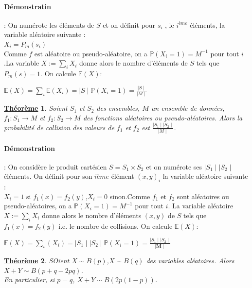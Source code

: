 \documentclass[12pt,openany]{report}
\newtheorem{theorem}{\underline{Théorème}}
\begin{document}
\paragraph{Démonstratin}: On numérote les éléments de $S$ et on définit pour $s_i$
, le $i^{ème}$ éléments, la variable aléatoire suivante :\\
$X_{i}=P_{m}(s_i)  $\\
Comme $f$ est aléatoire ou pseudo-aléatoire, on a $\mathbb{P}(X_i=1)=M^{-1}$ pour tout $i$.La variable $ X:=\sum_{i}X_i$ donne alors le nombre d'éléments de $ \mathit{S}$ tels que $P_{m}(s)=1 $. On calcule $\mathbb{E}(X)$:
\begin{center}
$ \mathbb{E}(X)=\sum_{i}\mathbb{E}(X_i)=\mid \mathit{S} \mid\mathbb{P}(X_i=1)=\frac{\mid S \mid}{\mid M \mid}$
\end{center}
\begin{theorem}
Soient $S_1$ et $S_2$ des ensembles, $ M $ un ensemble de données,$ f_1 : S_1 \rightarrow M $ et $ f_2 : S_2 \rightarrow M  $ des fonctions aléatoires ou pseudo-aléatoires. Alors la probabilité de collision des valeurs de $f_1$ et $ f_2$ est $\frac{\mid S_1 \mid \mid S_2 \mid}{\mid M \mid} $.\cite{Ghazal}
\end{theorem}

\paragraph{Démonstration}: On considère le produit cartésien $S = S_1 \times S_2$ et on numérote ses  $\mid S_1\mid \mid S_2\mid $ éléments. On définit pour son $i{ème}$ élément $(x, y)_i$
la variable aléatoire suivante :\\
$X_i=1$ si $f_1(x)=f_2(y)$,$X_i=0$ sinon.Comme $f_1$ et $f_2$ sont aléatoires ou pseudo-aléatoires, on a $\mathbb{P}(X_i=1)=M^{-1}$ pour tout $i$. La variable aléatoire $X:=\sum_{i}X_i$ donne alors le nombre d'éléments $(x,y)$ de $\mathit{S}$ tels que $f_1(x)=f_2(y) $ i.e. le nombre de collisions. On calcule $\mathbb{E}(X)$:\\
\begin{center}
$\mathbb{E}(X)=\sum_{i}(X_i)=\mid \mathit{S}_1 \mid \mid \mathit{S}_2 \mid \mathbb{P}(X_i=1)=\frac{ \mid \mathit{S}_1 \mid \mid \mathit{S}_2 \mid }{\mid \mathbf{M} \mid} $

\end{center}


\begin{theorem} SOient $ X \sim \mathit{B}(p)$,$ X \sim \mathit{B}(q) $ des variables aléatoires. Alors $X + Y \sim \mathit{B}(p+q-2pq)$.\\
En particulier, si $p=q$, $X + Y \sim \mathit{B}(2p(1-p))$.\cite{Ghazal}

\end{theorem}
\end{document}
